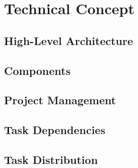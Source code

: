 \documentclass[10pt,journal,final,a4paper]{IEEEtran}
\begin{document}
\section{Technical Concept}
\label{sec:technical_concept}

\subsection{High-Level Architecture}
\label{subsec:high_level_architecture}

\subsection{Components}
\label{subsec:components_concept}

\subsection{Project Management}
\label{subsec:project_management}


\subsection{Task Dependencies}
\label{subsec:task_dependencies}

\subsection{Task Distribution}
\label{subsec:task_distribution}



\end{document}
